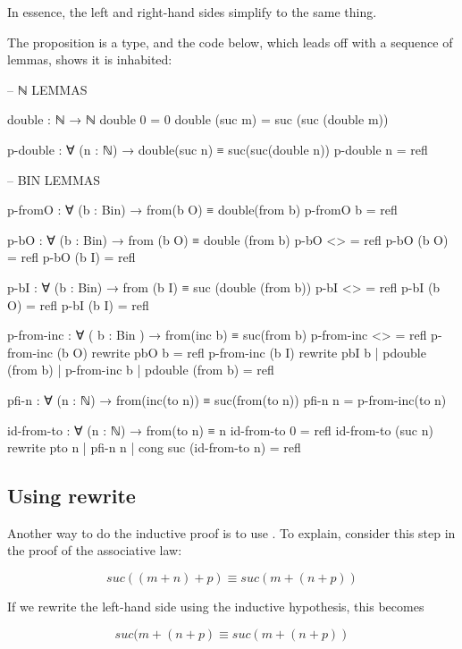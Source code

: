 In essence, the left and right-hand sides simplify to the same thing.

The proposition  is a type, and the code below, which leads off with a sequence of lemmas, shows it is inhabited:

\begin{colored}[elm]
-- ℕ LEMMAS

double : ℕ → ℕ
double 0 = 0
double (suc m) = suc (suc (double m))

p-double : ∀ (n : ℕ) → double(suc n) ≡ suc(suc(double n))
p-double n = refl
\end{colored}

\begin{colored}[elm]
-- BIN LEMMAS

p-fromO : ∀ (b : Bin) → from(b O) ≡ double(from b)
p-fromO b = refl

p-bO : ∀ (b : Bin) → from (b O) ≡ double (from b)
p-bO <> = refl
p-bO (b O) = refl
p-bO (b I) = refl

p-bI : ∀ (b : Bin) → from (b I) ≡ suc (double (from b))
p-bI <> = refl
p-bI (b O) = refl
p-bI (b I) = refl

p-from-inc : ∀ ( b : Bin ) → from(inc b) ≡ suc(from b)
p-from-inc <> = refl
p-from-inc (b O)  rewrite pbO b = refl
p-from-inc (b I) rewrite pbI b | pdouble (from b) | 
      p-from-inc b | pdouble (from b) = refl

pfi-n : ∀ (n : ℕ) → from(inc(to n)) ≡ suc(from(to n))
pfi-n n = p-from-inc(to n)

id-from-to : ∀ (n : ℕ) → from(to n) ≡ n
id-from-to 0 = refl
id-from-to (suc n) rewrite pto n | pfi-n n | 
    cong suc (id-from-to n) = refl
\end{colored}

\subsection{Using rewrite}


Another way to do the inductive proof is to use .  To explain, consider this step in the proof of the associative law:

$$
 suc ((m + n) + p) \equiv suc (m + (n + p))
$$

 If we rewrite the left-hand side using the inductive hypothesis, this becomes

\begin{equation}
suc (m + (n + p) \equiv suc (m + (n + p))
\end{equation}

